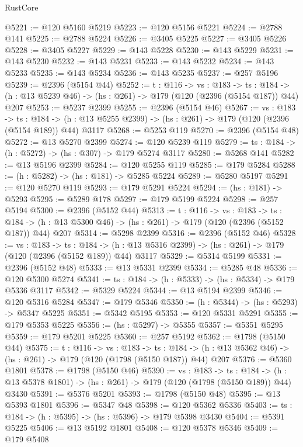\begin{lexlean}{RustCore}
\begin{coremodule}
@5221 := @120 @5160 @5219
@5223 := @120 @5156 @5221
@5224 := @2788 @141
@5225 := @2788 @5224
@5226 := @3405 @5225
@5227 := @3405 @5226
@5228 := @3405 @5227
@5229 := @143 @5228
@5230 := @143 @5229
@5231 := @143 @5230
@5232 := @143 @5231
@5233 := @143 @5232
@5234 := @143 @5233
@5235 := @143 @5234
@5236 := @143 @5235
@5237 := @257 @5196
@5239 := @2396 (@5154 @44)
@5252 := {t : @116} ->
  {vs : @183} ->
  {ts : @184} -> (h : @13 @5239 @46) -> (hs : @261) -> @179 (@120 (@2396 (@5154 @187)) @44) @207
@5253 := @5237 @2399
@5255 := @2396 (@5154 @46)
@5267 := {vs : @183} ->
  {ts : @184} -> (h : @13 @5255 @2399) -> (hs : @261) -> @179 (@120 (@2396 (@5154 @189)) @44) @3117
@5268 := @5253 @119
@5270 := @2396 (@5154 @48)
@5272 := @13 @5270 @2399
@5274 := @120 @5239 @119
@5279 := {ts : @184} -> (h : @5272) -> (hs : @307) -> @179 @5274 @3117
@5280 := @5268 @141
@5282 := @13 @5196 @2399
@5284 := @120 @5255 @119
@5285 := @179 @5284
@5288 := (h : @5282) -> (hs : @181) -> @5285 @5224
@5289 := @5280 @5197
@5291 := @120 @5270 @119
@5293 := @179 @5291 @5224
@5294 := (hs : @181) -> @5293
@5295 := @5289 @178
@5297 := @179 @5199 @5224
@5298 := @257 @5194
@5300 := @2396 (@5152 @44)
@5313 := {t : @116} ->
  {vs : @183} ->
  {ts : @184} -> (h : @13 @5300 @46) -> (hs : @261) -> @179 (@120 (@2396 (@5152 @187)) @44) @207
@5314 := @5298 @2399
@5316 := @2396 (@5152 @46)
@5328 := {vs : @183} ->
  {ts : @184} -> (h : @13 @5316 @2399) -> (hs : @261) -> @179 (@120 (@2396 (@5152 @189)) @44) @3117
@5329 := @5314 @5199
@5331 := @2396 (@5152 @48)
@5333 := @13 @5331 @2399
@5334 := @5285 @48
@5336 := @120 @5300 @5274
@5341 := {ts : @184} -> (h : @5333) -> (hs : @5334) -> @179 @5336 @3117
@5342 := @5329 @5224
@5344 := @13 @5194 @2399
@5346 := @120 @5316 @5284
@5347 := @179 @5346
@5350 := (h : @5344) -> (hs : @5293) -> @5347 @5225
@5351 := @5342 @5195
@5353 := @120 @5331 @5291
@5355 := @179 @5353 @5225
@5356 := (hs : @5297) -> @5355
@5357 := @5351 @5295
@5359 := @179 @5201 @5225
@5360 := @257 @5192
@5362 := @1798 (@5150 @44)
@5375 := {t : @116} ->
  {vs : @183} ->
  {ts : @184} -> (h : @13 @5362 @46) -> (hs : @261) -> @179 (@120 (@1798 (@5150 @187)) @44) @207
@5376 := @5360 @1801
@5378 := @1798 (@5150 @46)
@5390 := {vs : @183} ->
  {ts : @184} -> (h : @13 @5378 @1801) -> (hs : @261) -> @179 (@120 (@1798 (@5150 @189)) @44) @3430
@5391 := @5376 @5201
@5393 := @1798 (@5150 @48)
@5395 := @13 @5393 @1801
@5396 := @5347 @48
@5398 := @120 @5362 @5336
@5403 := {ts : @184} -> (h : @5395) -> (hs : @5396) -> @179 @5398 @3430
@5404 := @5391 @5225
@5406 := @13 @5192 @1801
@5408 := @120 @5378 @5346
@5409 := @179 @5408

\end{coremodule}
\end{lexlean}

